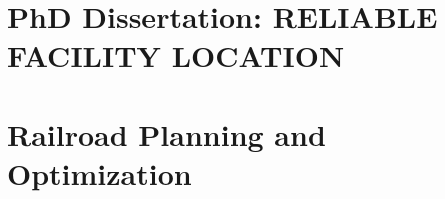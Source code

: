 \documentclass[twoside,openright,titlepage,numbers=noenddot,headinclude,%
               footinclude=true,cleardoublepage=empty,abstractoff, %
               BCOR=5mm,paper=a4,fontsize=11pt,%
               ngerman,american,%
               ]{scrreprt}
\begin{document}
\raggedbottom
{} %
\pagestyle{plain}




\cleardoublepage
\cleardoublepage
\cleardoublepage
\cleardoublepage
\cleardoublepage




\pagestyle{scrheadings}
\cleardoublepage


\part{PhD Dissertation: RELIABLE FACILITY LOCATION}\label{part:dissertation}


\cleardoublepage


\part{Railroad Planning and Optimization}\label{part:railroad}

\cleardoublepage




\end{document}
